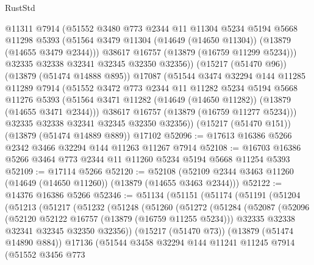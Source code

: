 \begin{lexlean}{RustStd}
\begin{coremodule}
          @11311
          @7914
          (@51552
            @3480
            @773
            @2344
            @11
            @11304
            @5234
            @5194
            @5668
            @11298
            @5393
            (@51564 @3479 @11304 (@14649 (@14650 @11304)) (@13879 (@14655 @3479 @2344)))
            @38617
            @16757
            (@13879 (@16759 @11299 @5234)))
          @32335
          @32338
          @32341
          @32345
          @32350
          @32356))
      (@15217 (@51470 @96))
      (@13879 (@51474 @14888 @895))
      @17087
      (@51544
        @3474
        @32294
        @144
        @11285
        @11289
        @7914
        (@51552
          @3472
          @773
          @2344
          @11
          @11282
          @5234
          @5194
          @5668
          @11276
          @5393
          (@51564 @3471 @11282 (@14649 (@14650 @11282)) (@13879 (@14655 @3471 @2344)))
          @38617
          @16757
          (@13879 (@16759 @11277 @5234)))
        @32335
        @32338
        @32341
        @32345
        @32350
        @32356))
    (@15217 (@51470 @151))
    (@13879 (@51474 @14889 @889))
    @17102
@52096 := @17613 @16386 @5266 @2342 @3466 @32294 @144 @11263 @11267 @7914
@52108 := @16703 @16386 @5266 @3464 @773 @2344 @11 @11260 @5234 @5194 @5668 @11254 @5393
@52109 := @17114 @5266
@52120 := @52108 (@52109 @2344 @3463 @11260 (@14649 (@14650 @11260)) (@13879 (@14655 @3463 @2344)))
@52122 := @14376 @16386 @5266
@52346 := @51134
    (@51151
      (@51174
        (@51191
          (@51204
            (@51213
              (@51217
                (@51232
                  (@51248
                    (@51260
                      (@51272
                        (@51284
                          (@52087
                            (@52096
                              (@52120 @52122 @16757 (@13879 (@16759 @11255 @5234)))
                              @32335
                              @32338
                              @32341
                              @32345
                              @32350
                              @32356))
                          (@15217 (@51470 @73))
                          (@13879 (@51474 @14890 @884))
                          @17136
                          (@51544
                            @3458
                            @32294
                            @144
                            @11241
                            @11245
                            @7914
                            (@51552
                              @3456
                              @773

\end{coremodule}
\end{lexlean}
